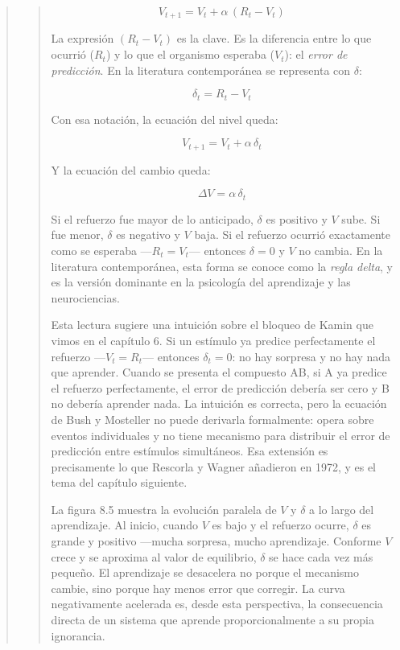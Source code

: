 \documentclass[
  letterpaper,
  DIV=11,
  numbers=noendperiod]{scrreprt}
\begin{document}
\begin{tcolorbox}[enhanced jigsaw, arc=.35mm, bottomrule=.15mm, breakable, colback=white, colframe=quarto-callout-note-color-frame, left=2mm, leftrule=.75mm, opacityback=0, rightrule=.15mm, toprule=.15mm]
\begin{quote}
\begin{quote}
\[V_{t+1} = V_t + \alpha\,(R_t - V_t)\]

La expresión \((R_t - V_t)\) es la clave. Es la diferencia entre lo que
ocurrió (\(R_t\)) y lo que el organismo esperaba (\(V_t\)): el
\emph{error de predicción}. En la literatura contemporánea se representa
con \(\delta\):

\[\delta_t = R_t - V_t\]

Con esa notación, la ecuación del nivel queda:

\[V_{t+1} = V_t + \alpha\,\delta_t\]

Y la ecuación del cambio queda:

\[\Delta V = \alpha\,\delta_t\]

Si el refuerzo fue mayor de lo anticipado, \(\delta\) es positivo y
\(V\) sube. Si fue menor, \(\delta\) es negativo y \(V\) baja. Si el
refuerzo ocurrió exactamente como se esperaba ---\(R_t = V_t\)---
entonces \(\delta = 0\) y \(V\) no cambia. En la literatura
contemporánea, esta forma se conoce como la \emph{regla delta}, y es la
versión dominante en la psicología del aprendizaje y las neurociencias.

Esta lectura sugiere una intuición sobre el bloqueo de Kamin que vimos
en el capítulo 6. Si un estímulo ya predice perfectamente el refuerzo
---\(V_t = R_t\)--- entonces \(\delta_t = 0\): no hay sorpresa y no hay
nada que aprender. Cuando se presenta el compuesto AB, si A ya predice
el refuerzo perfectamente, el error de predicción debería ser cero y B
no debería aprender nada. La intuición es correcta, pero la ecuación de
Bush y Mosteller no puede derivarla formalmente: opera sobre eventos
individuales y no tiene mecanismo para distribuir el error de predicción
entre estímulos simultáneos. Esa extensión es precisamente lo que
Rescorla y Wagner añadieron en 1972, y es el tema del capítulo
siguiente.

La figura 8.5 muestra la evolución paralela de \(V\) y \(\delta\) a lo
largo del aprendizaje. Al inicio, cuando \(V\) es bajo y el refuerzo
ocurre, \(\delta\) es grande y positivo ---mucha sorpresa, mucho
aprendizaje. Conforme \(V\) crece y se aproxima al valor de equilibrio,
\(\delta\) se hace cada vez más pequeño. El aprendizaje se desacelera no
porque el mecanismo cambie, sino porque hay menos error que corregir. La
curva negativamente acelerada es, desde esta perspectiva, la
consecuencia directa de un sistema que aprende proporcionalmente a su
propia ignorancia.

\begin{figure}[H]


\end{figure}
\end{quote}
\end{quote}
\end{tcolorbox}
\end{document}
